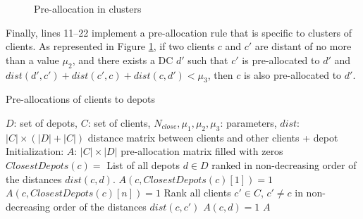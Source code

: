 \documentclass[a4paper,10pt]{article}
\begin{document}
\begin{linenumbers}
\begin{figure}[htbp]
	\caption{Pre-allocation in clusters}
	\label{fig:prealloc}
\end{figure}

Finally, lines 11--22 implement a pre-allocation rule that is specific to clusters of clients. 
As represented in Figure \ref{fig:prealloc}, 
if two clients $c$ and $c'$ are distant of no more than a value $\mu_2$, and there exists a DC $d'$ such that
$c'$ is pre-allocated to $d'$ and $dist(d',c') + dist(c',c) + dist(c,d') < \mu_3$, then $c$ is also pre-allocated to $d'$. 

 
 \begin{algorithm}
	\caption{Pre-allocations of clients to depots}
	\label{algo:pre-allocation}
	\begin{algorithmic}[1]
		\REQUIRE  $D$: set of depots, $C$: set of clients, $N_{close}, \mu_1, \mu_2, \mu_3$: parameters, 
		$dist$: $|C|\times (|D|+|C|)$ distance matrix between clients and other clients + depot
		\STATE Initialization: $A$: $|C| \times |D|$ pre-allocation matrix filled with zeros
			\STATE $ClosestDepots(c) = $ List of all depots $d \in D$ ranked in non-decreasing order of the distances $dist(c,d)$.
			\STATE 	$A(c,ClosestDepots(c)[1]) =1$ 	
					\STATE 	$A(c,ClosestDepots(c)[n]) =1$ 			
				\ENDIF
			\ENDFOR
		\ENDFOR
			\STATE Rank all clients $c' \in C$, $c' \neq c$ in non-decreasing order of the distances $dist(c,c')$ 
							\STATE $A(c,d) =1$
						\ENDIF
					\ENDFOR
				\ENDIF
			\ENDFOR
		\ENDFOR
		\RETURN $A$
	\end{algorithmic}
\end{algorithm}







\end{linenumbers}
\end{document}
